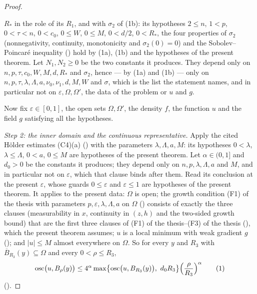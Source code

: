 \begin{proof}
\begin{enumerate}
  $R_\ast$ in the role of its $R_1$, and with $\sigma_2$ of (1b): its hypotheses
  $2\le n$, $1<p$, $0<\tau<n$, $0<c_0$, $0\le W$, $0\le M$, $0<d/2$,
  $0<R_\ast$, the four properties of $\sigma_2$ (nonnegativity, continuity,
  monotonicity and $\sigma_2(0)=0$) and the Sobolev--Poincar\'e inequality
  () hold by (1a), (1b) and the hypotheses of
  the present theorem.  Let $N_1,N_2\ge0$ be the two constants it produces.
  They depend only on $n,p,\tau,c_0,W,M,d,R_\ast$ and $\sigma_2$, hence --- by
  (1a) and (1b) --- only on
  $n,p,\tau,\lambda,\Lambda,a,\nu_0,\nu_1,d,M,W$ and $\sigma$, which is the
  list the statement names, and in particular not on
  $\varepsilon,\Omega,\Omega'$, the data of the problem or $u$ and $g$.
\end{enumerate}

Now fix $\varepsilon\in[0,1]$, the open sets $\Omega,\Omega'$, the density $f$,
the function $u$ and the field $g$ satisfying all the hypotheses.

\emph{Step 2: the inner domain and the continuous representative.}  Apply the
cited H\"older estimates (C4)(a)
() with the parameters
$\lambda,\Lambda,a,M$: its hypotheses $0<\lambda$, $\lambda\le\Lambda$,
$0<a$, $0\le M$ are hypotheses of the present theorem.  Let $\alpha\in(0,1]$
and $d_0>0$ be the constants it produces; they depend only on
$n,p,\lambda,\Lambda,a$ and $M$, and in particular not on $\varepsilon$, which
that clause binds after them.  Read its conclusion at the present
$\varepsilon$, whose guards $0\le\varepsilon$ and $\varepsilon\le1$ are
hypotheses of the present theorem.  It applies to the present data: $\Omega$ is
open; the growth condition (F1) of the thesis with parameters
$p,\varepsilon,\lambda,\Lambda,a$ on $\Omega$ ()
consists of exactly the three clauses (measurability in $x$, continuity in
$(z,h)$ and the two-sided growth bound) that are the first three clauses of
(F1) of the thesis--(F3) of the thesis (), which the
present theorem assumes; $u$ is a local minimum with weak gradient $g$
(); and $|u|\le M$ almost everywhere on $\Omega$.  So
for every $y$ and $R_3$ with $\overline B_{R_3}(y)\subseteq\Omega$ and every
$0<\rho\le R_3$,
\[
\operatorname*{osc}\bigl(u,B_\rho(y)\bigr)\le4^\alpha
\max\bigl\{\operatorname*{osc}\bigl(u,B_{R_3}(y)\bigr),\ d_0R_3\bigr\}
\Bigl(\frac\rho{R_3}\Bigr)^\alpha
\tag{1}
\]
().


\end{proof}
